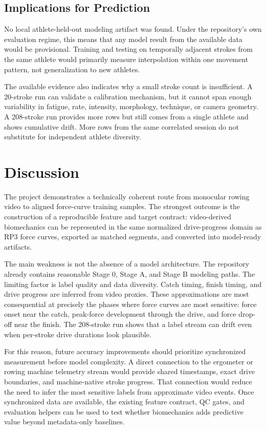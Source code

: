 \documentclass[11pt]{article}
\begin{document}
\subsection{Implications for Prediction}
No local athlete-held-out modeling artifact was found. Under the repository's own evaluation regime, this means that any model result from the available data would be provisional. Training and testing on temporally adjacent strokes from the same athlete would primarily measure interpolation within one movement pattern, not generalization to new athletes.

The available evidence also indicates why a small stroke count is insufficient. A 20-stroke run can validate a calibration mechanism, but it cannot span enough variability in fatigue, rate, intensity, morphology, technique, or camera geometry. A 208-stroke run provides more rows but still comes from a single athlete and shows cumulative drift. More rows from the same correlated session do not substitute for independent athlete diversity.

\section{Discussion}
The project demonstrates a technically coherent route from monocular rowing video to aligned force-curve training samples. The strongest outcome is the construction of a reproducible feature and target contract: video-derived biomechanics can be represented in the same normalized drive-progress domain as RP3 force curves, exported as matched segments, and converted into model-ready artifacts.

The main weakness is not the absence of a model architecture. The repository already contains reasonable Stage 0, Stage A, and Stage B modeling paths. The limiting factor is label quality and data diversity. Catch timing, finish timing, and drive progress are inferred from video proxies. These approximations are most consequential at precisely the phases where force curves are most sensitive: force onset near the catch, peak-force development through the drive, and force drop-off near the finish. The 208-stroke run shows that a label stream can drift even when per-stroke drive durations look plausible.

For this reason, future accuracy improvements should prioritize synchronized measurement before model complexity. A direct connection to the ergometer or rowing machine telemetry stream would provide shared timestamps, exact drive boundaries, and machine-native stroke progress. That connection would reduce the need to infer the most sensitive labels from approximate video events. Once synchronized data are available, the existing feature contract, QC gates, and evaluation helpers can be used to test whether biomechanics adds predictive value beyond metadata-only baselines.
\end{document}
